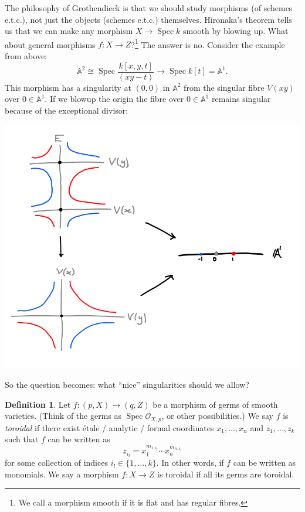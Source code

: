 \documentclass{article}
\theoremstyle{definition}
\newtheorem*{definition}{Definition}
\DeclareMathOperator{\Spec}{Spec}
\renewcommand{\O}{\mathcal{O}}
\newcommand{\A}{\mathbb{A}}
\begin{document}
The philosophy of Grothendieck is that we should study morphisms (of schemes
e.t.c.), not just the objects (schemes e.t.c.) themselves. Hironaka's theorem
tells us that we can make any morphism $X\to\Spec k$ smooth by blowing up. What
about general morphisms $f:X\to Z$?\footnote{We call a morphism smooth if it is
flat and has regular fibres.} The answer is no. Consider the example from above:
\begin{equation*}
    \A^2 \cong \Spec\frac{k[x,y,t]}{(xy-t)} \to \Spec k[t] = \A^1.
\end{equation*}
This morphism has a singularity at $(0,0)$ in $\A^2$ from the singular fibre
$V(xy)$ over $0\in\A^1$. If we blowup the origin the fibre over $0\in\A^1$
remains singular because of the exceptional divisor:
\begin{center}
    \includegraphics[scale=0.4]{hyperbola_blowup}
\end{center}
So the question becomes: what ``nice'' singularities should we allow?

\begin{definition}
    Let $f:(p,X)\to(q,Z)$ be a morphism of germs of smooth varieties. (Think of
    the germs as $\Spec\O_{X,p}$, or other possibilities.) We say $f$ is
    \emph{toroidal} if there exist \'etale / analytic / formal coordinates
    $x_1,\ldots,x_n$ and $z_1,\ldots,z_k$ such that $f$ can be written as
    \begin{equation*}
        z_{i_l} = x_1^{m_{1,i_l}}\cdots x_n^{m_{n,i_l}}
    \end{equation*}
    for some collection of indices $i_l\in\{1,\ldots,k\}$. In other words, if
    $f$ can be written as monomials. We say a morphism $f:X\to Z$ is toroidal if
    all its germs are toroidal.
\end{definition}
\end{document}
